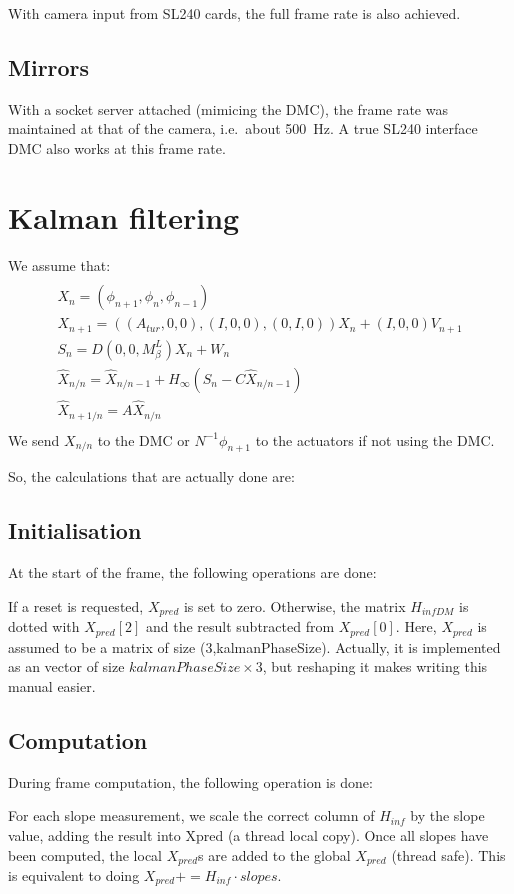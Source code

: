 \documentclass[a4,10pt]{article}
\begin{document}
With camera input from SL240 cards, the full frame rate is also achieved.



\subsection{Mirrors}
With a socket server attached (mimicing the DMC), the frame rate was
maintained at that of the camera, i.e.\ about 500~Hz.  A true SL240
interface DMC also works at this frame rate.


\section{Kalman filtering}
We assume that:
\begin{multline}\\
X_n=(\phi_{n+1},\phi_{n},\phi_{n-1})\\
X_{n+1} = ((A_{tur}, 0, 0), (I, 0, 0), (0, I, 0)) X_n + (I, 0, 0)
V_{n+1}\\
S_n = D (0, 0, M_\beta^L) X_n + W_n\\
\hat{X}_{n/n} = \hat{X}_{n/n-1} + H_\infty (S_n -C\hat{X}_{n/n-1})\\
\hat{X}_{n+1/n} = A\hat{X}_{n/n}\\
\end{multline}
We send $X_{n/n}$ to the DMC or $N^{-1} \phi_{n+1}$ to the actuators
if not using the DMC.

So, the calculations that are actually done are:
\subsection{Initialisation}
At the start of the frame, the following operations are done:

If a reset is requested, $X_{pred}$ is set to zero.  Otherwise, the matrix
$H_{infDM}$ is dotted with $X_{pred}[2]$ and the result subtracted from
$X_{pred}[0]$.  Here, $X_{pred}$ is assumed to be a matrix of size
(3,kalmanPhaseSize).  Actually, it is implemented as an vector of size
$kalmanPhaseSize\times 3$, but reshaping it makes writing this manual easier.


\subsection{Computation}
During frame computation, the following operation is done:

For each slope measurement, we scale the correct column of $H_{inf}$ by the
slope value, adding the result into Xpred (a thread local copy).  Once
all slopes have been computed, the local $X_{pred}$s are added to the
global $X_{pred}$ (thread safe).  This is equivalent to doing $X_{pred}+=H_{inf}
\cdot slopes$.  
\end{document}
